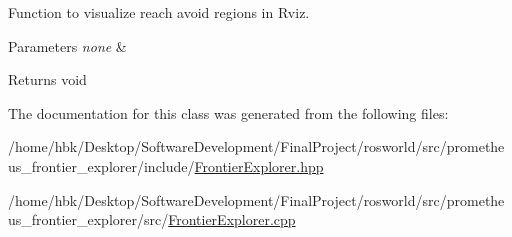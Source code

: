 Function to visualize reach avoid regions in Rviz. 


\begin{DoxyParams}{Parameters}
{\em none} & \\
\hline
\end{DoxyParams}
\begin{DoxyReturn}{Returns}
void 
\end{DoxyReturn}


The documentation for this class was generated from the following files\+:\begin{DoxyCompactItemize}
\item 
/home/hbk/\+Desktop/\+Software\+Development/\+Final\+Project/rosworld/src/prometheus\+\_\+frontier\+\_\+explorer/include/\hyperlink{FrontierExplorer_8hpp}{Frontier\+Explorer.\+hpp}\item 
/home/hbk/\+Desktop/\+Software\+Development/\+Final\+Project/rosworld/src/prometheus\+\_\+frontier\+\_\+explorer/src/\hyperlink{FrontierExplorer_8cpp}{Frontier\+Explorer.\+cpp}\end{DoxyCompactItemize}
